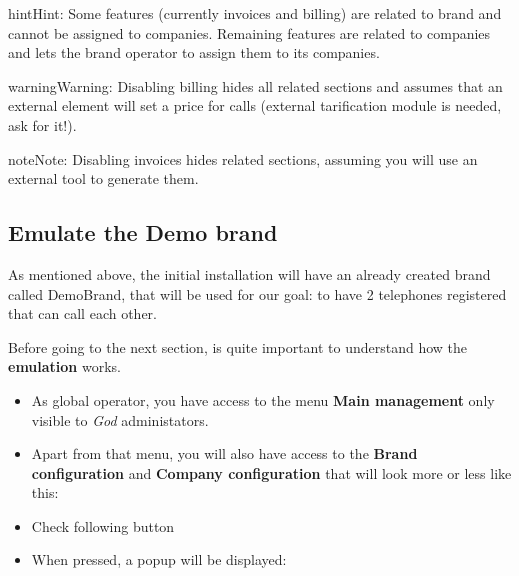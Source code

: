 \documentclass[letterpaper,10pt,english]{sphinxmanual}
\begin{document}
\begin{notice}{hint}{Hint:}
Some features (currently invoices and billing) are related to brand and
cannot be assigned to companies. Remaining features are related to
companies and lets the brand operator to assign them to its companies.
\end{notice}

\begin{notice}{warning}{Warning:}
Disabling billing hides all related sections and assumes that an
external element will set a price for calls (external tarification
module is needed, ask for it!).
\end{notice}

\begin{notice}{note}{Note:}
Disabling invoices hides related sections, assuming you will use an
external tool to generate them.
\end{notice}


\subsection{Emulate the Demo brand}
\label{internal_calls/god_portal:emulate-the-demo-brand}
As mentioned above, the initial installation will have an already created brand
called DemoBrand, that will be used for our goal: to have 2 telephones registered
that can call each other.

Before going to the next section, is quite important to understand how the
\textbf{emulation} works.
\begin{itemize}
\item {} 
As global operator, you have access to the menu \textbf{Main management} only
visible to \emph{God} administators.

\item {} 
Apart from that menu, you will also have access to the \textbf{Brand configuration}
and \textbf{Company configuration} that will look more or less like this:

\end{itemize}

\begin{itemize}
\item {} 
Check following button

\end{itemize}

\begin{itemize}
\item {} 
When pressed, a popup will be displayed:

\end{itemize}
\end{document}
